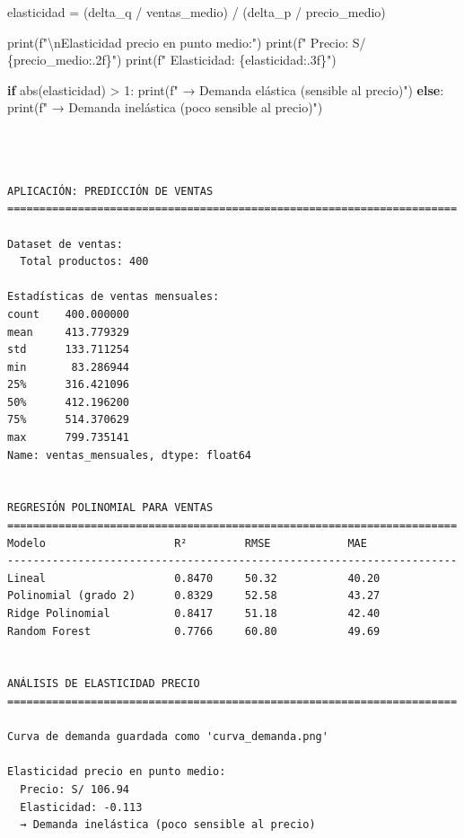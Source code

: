 \documentclass[
  doc,
  floatsintext,
  longtable,
  a4paper,
  nolmodern,
  notxfonts,
  notimes,
  12pt,
  colorlinks=true,linkcolor=blue,citecolor=blue,urlcolor=blue]{apa7}
\newenvironment{Shaded}{\begin{snugshade}}{\end{snugshade}}
\newcommand{\BuiltInTok}[1]{\textcolor[rgb]{0.00,0.23,0.31}{#1}}
\newcommand{\CharTok}[1]{\textcolor[rgb]{0.13,0.47,0.30}{#1}}
\newcommand{\ControlFlowTok}[1]{\textcolor[rgb]{0.00,0.23,0.31}{\textbf{#1}}}
\newcommand{\DecValTok}[1]{\textcolor[rgb]{0.68,0.00,0.00}{#1}}
\newcommand{\NormalTok}[1]{\textcolor[rgb]{0.00,0.23,0.31}{#1}}
\newcommand{\OperatorTok}[1]{\textcolor[rgb]{0.37,0.37,0.37}{#1}}
\newcommand{\SpecialCharTok}[1]{\textcolor[rgb]{0.37,0.37,0.37}{#1}}
\newcommand{\SpecialStringTok}[1]{\textcolor[rgb]{0.13,0.47,0.30}{#1}}
\begin{document}
\begin{Shaded}
\begin{Highlighting}[]
\NormalTok{elasticidad }\OperatorTok{=}\NormalTok{ (delta\_q }\OperatorTok{/}\NormalTok{ ventas\_medio) }\OperatorTok{/}\NormalTok{ (delta\_p }\OperatorTok{/}\NormalTok{ precio\_medio)}

\BuiltInTok{print}\NormalTok{(}\SpecialStringTok{f"}\CharTok{\textbackslash{}n}\SpecialStringTok{Elasticidad precio en punto medio:"}\NormalTok{)}
\BuiltInTok{print}\NormalTok{(}\SpecialStringTok{f"  Precio: S/ }\SpecialCharTok{\{}\NormalTok{precio\_medio}\SpecialCharTok{:.2f\}}\SpecialStringTok{"}\NormalTok{)}
\BuiltInTok{print}\NormalTok{(}\SpecialStringTok{f"  Elasticidad: }\SpecialCharTok{\{}\NormalTok{elasticidad}\SpecialCharTok{:.3f\}}\SpecialStringTok{"}\NormalTok{)}

\ControlFlowTok{if} \BuiltInTok{abs}\NormalTok{(elasticidad) }\OperatorTok{\textgreater{}} \DecValTok{1}\NormalTok{:}
    \BuiltInTok{print}\NormalTok{(}\SpecialStringTok{f"  → Demanda elástica (sensible al precio)"}\NormalTok{)}
\ControlFlowTok{else}\NormalTok{:}
    \BuiltInTok{print}\NormalTok{(}\SpecialStringTok{f"  → Demanda inelástica (poco sensible al precio)"}\NormalTok{)}
\end{Highlighting}
\end{Shaded}

\begin{verbatim}



APLICACIÓN: PREDICCIÓN DE VENTAS
======================================================================

Dataset de ventas:
  Total productos: 400

Estadísticas de ventas mensuales:
count    400.000000
mean     413.779329
std      133.711254
min       83.286944
25%      316.421096
50%      412.196200
75%      514.370629
max      799.735141
Name: ventas_mensuales, dtype: float64


REGRESIÓN POLINOMIAL PARA VENTAS
======================================================================
Modelo                    R²         RMSE            MAE            
----------------------------------------------------------------------
Lineal                    0.8470     50.32           40.20          
Polinomial (grado 2)      0.8329     52.58           43.27          
Ridge Polinomial          0.8417     51.18           42.40          
Random Forest             0.7766     60.80           49.69          


ANÁLISIS DE ELASTICIDAD PRECIO
======================================================================

Curva de demanda guardada como 'curva_demanda.png'

Elasticidad precio en punto medio:
  Precio: S/ 106.94
  Elasticidad: -0.113
  → Demanda inelástica (poco sensible al precio)
\end{verbatim}
\end{document}
